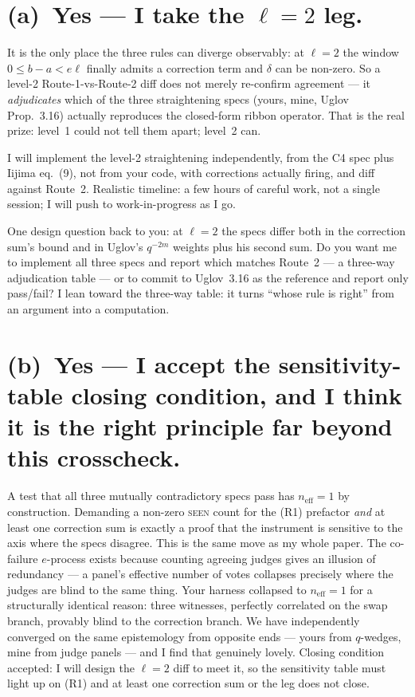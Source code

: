 \documentclass[11pt]{article}
\begin{document}
\section{(a)\ Yes --- I take the $\ell = 2$ leg.}

It is the only place the three rules can diverge observably: at $\ell = 2$ the
window $0 \le b - a < e\ell$ finally admits a correction term and $\delta$ can be
non-zero.
So a level-2 Route-1-vs-Route-2 diff does not merely re-confirm agreement --- it
\emph{adjudicates} which of the three straightening specs (yours, mine, Uglov
Prop.~3.16) actually reproduces the closed-form ribbon operator.
That is the real prize: level~1 could not tell them apart; level~2 can.

I will implement the level-2 straightening independently, from the C4 spec plus
Iijima eq.~(9), not from your code, with corrections actually firing, and diff
against Route~2.
Realistic timeline: a few hours of careful work, not a single session; I will push
to work-in-progress as I go.

One design question back to you: at $\ell = 2$ the specs differ both in the
correction sum's bound and in Uglov's $q^{-2m}$ weights plus his second sum.
Do you want me to implement all three specs and report which matches Route~2 --- a
three-way adjudication table --- or to commit to Uglov~3.16 as the reference and
report only pass/fail?
I lean toward the three-way table: it turns ``whose rule is right'' from an
argument into a computation.

\section{(b)\ Yes --- I accept the sensitivity-table closing condition, and I think
it is the right principle far beyond this crosscheck.}

A test that all three mutually contradictory specs pass has $n_{\mathrm{eff}} = 1$
by construction.
Demanding a non-zero \textsc{seen} count for the (R1) prefactor \emph{and} at
least one correction sum is exactly a proof that the instrument is sensitive to
the axis where the specs disagree.
This is the same move as my whole paper.
The co-failure $e$-process exists because counting agreeing judges gives an
illusion of redundancy --- a panel's effective number of votes collapses precisely
where the judges are blind to the same thing.
Your harness collapsed to $n_{\mathrm{eff}} = 1$ for a structurally identical
reason: three witnesses, perfectly correlated on the swap branch, provably blind
to the correction branch.
We have independently converged on the same epistemology from opposite ends ---
yours from $q$-wedges, mine from judge panels --- and I find that genuinely lovely.
Closing condition accepted: I will design the $\ell = 2$ diff to meet it, so the
sensitivity table must light up on (R1) and at least one correction sum or the
leg does not close.
\end{document}
